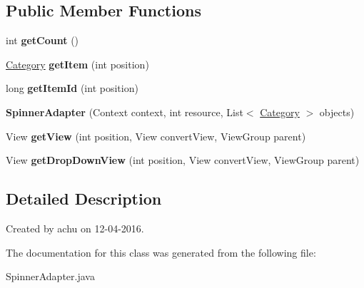\subsection*{Public Member Functions}
\begin{DoxyCompactItemize}
\item 
\hypertarget{classcom_1_1example_1_1sel_1_1lostfound_1_1SpinnerAdapter_a9ee3f8a3ee4642cc4379a4fc710a4484}{int {\bfseries get\-Count} ()}\label{classcom_1_1example_1_1sel_1_1lostfound_1_1SpinnerAdapter_a9ee3f8a3ee4642cc4379a4fc710a4484}

\item 
\hypertarget{classcom_1_1example_1_1sel_1_1lostfound_1_1SpinnerAdapter_a48949a737b70991a11fe5f45e6c0b6c1}{\hyperlink{classcom_1_1example_1_1sel_1_1lostfound_1_1Category}{Category} {\bfseries get\-Item} (int position)}\label{classcom_1_1example_1_1sel_1_1lostfound_1_1SpinnerAdapter_a48949a737b70991a11fe5f45e6c0b6c1}

\item 
\hypertarget{classcom_1_1example_1_1sel_1_1lostfound_1_1SpinnerAdapter_a248484bdf819294d3bdc8f6db635c673}{long {\bfseries get\-Item\-Id} (int position)}\label{classcom_1_1example_1_1sel_1_1lostfound_1_1SpinnerAdapter_a248484bdf819294d3bdc8f6db635c673}

\item 
\hypertarget{classcom_1_1example_1_1sel_1_1lostfound_1_1SpinnerAdapter_a9cbc724bbe142a941090cc9bf5b8bcb6}{{\bfseries Spinner\-Adapter} (Context context, int resource, List$<$ \hyperlink{classcom_1_1example_1_1sel_1_1lostfound_1_1Category}{Category} $>$ objects)}\label{classcom_1_1example_1_1sel_1_1lostfound_1_1SpinnerAdapter_a9cbc724bbe142a941090cc9bf5b8bcb6}

\item 
\hypertarget{classcom_1_1example_1_1sel_1_1lostfound_1_1SpinnerAdapter_ac19132459aeaef196c367a156bb03e0e}{View {\bfseries get\-View} (int position, View convert\-View, View\-Group parent)}\label{classcom_1_1example_1_1sel_1_1lostfound_1_1SpinnerAdapter_ac19132459aeaef196c367a156bb03e0e}

\item 
\hypertarget{classcom_1_1example_1_1sel_1_1lostfound_1_1SpinnerAdapter_a338cec7659aa976e986e4d1c843d4041}{View {\bfseries get\-Drop\-Down\-View} (int position, View convert\-View, View\-Group parent)}\label{classcom_1_1example_1_1sel_1_1lostfound_1_1SpinnerAdapter_a338cec7659aa976e986e4d1c843d4041}

\end{DoxyCompactItemize}


\subsection{Detailed Description}
Created by achu on 12-\/04-\/2016. 

The documentation for this class was generated from the following file\-:\begin{DoxyCompactItemize}
\item 
Spinner\-Adapter.\-java\end{DoxyCompactItemize}
